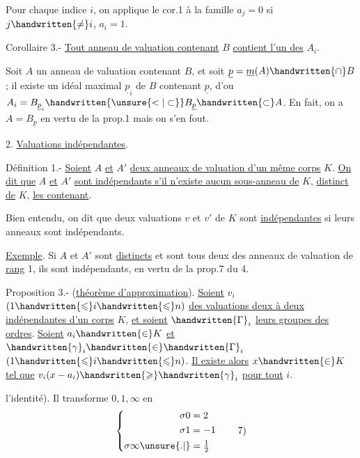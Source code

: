 Pour chaque indice $i$, on applique le cor.1 à la famille $a_j=0$ si $j\handwritten{\ne}i$, $a_i=1$.

Corollaire 3.- \uline{Tout anneau de valuation contenant} $B$ \uline{contient l'un des} $A_i$.

Soit $A$ un anneau de valuation contenant $B$, et soit $\underline{p}=\underline{m}(A)\handwritten{\cap}B$; il existe un idéal maximal $\underline{p}_i$ de $B$ contenant $\underline{p}$, d'ou $A_i=B_{\underline{p}_i}\handwritten{\unsure{<|\subset}}B_{\underline p}\handwritten{\subset}A$. \handwritten{[}En fait, on a $A=B_{\underline p}$ en vertu de la prop.1\unsure{;|,} mais on s'en fout.\handwritten{]}

2. \uline{Valuations indépendantes}.

Définition 1.- \uline{Soient} $A$ \uline{et} $A'$ \uline{deux anneaux de valuation d'un même corps} $K$. \uline{On dit que} $A$ \uline{et} $A'$ \uline{sont indépendants s'il n'existe aucun sous-anneau de} $K$, \uline{distinct de} $K$, \uline{les contenant}.

Bien entendu, on dit que deux valuations $v$ et $v'$ de $K$ sont \uline{indépendantes} si leurs anneaux sont indépendants.

\uline{Exemple}. Si $A$ et $A'$ sont \uline{distincts} et sont tous deux des anneaux de valuation de \uline{rang} 1, ils sont indépendants, en vertu de la prop.7 du \handwritten{\S}4.

Proposition 3.- (\uline{théorème d'approximation}). \uline{Soient} $v_i$ $(1\handwritten{\leqslant}i\handwritten{\leqslant}n)$ \uline{des valuations deux à deux indépendantes d'un corps} $K$, \uline{et soient} $\handwritten{\Gamma}_i$ \uline{leurs groupes des ordres}. \uline{Soient} $a_i\handwritten{\in}K$ \uline{et} $\handwritten{\gamma}_i\handwritten{\in}\handwritten{\Gamma}_i$ $(1\handwritten{\leqslant}i\handwritten{\leqslant}n)$. \uline{Il existe alors} $x\handwritten{\in}K$ \uline{tel que} $v_i(x-a_i)\handwritten{\geqslant}\handwritten{\gamma}_i$ \uline{pour tout} $i$.

l'identité). Il transforme $0,1,\infty$ en
\begingroup\makeatletter\tagsleft@true\makeatother
\[
\left\{\begin{aligned}
\sigma0&=2\\
\sigma1&=-1\\
\sigma\infty\unsure{.|}&=\tfrac12
\end{aligned}\right.\tag*{7)}
\]
\endgroup

